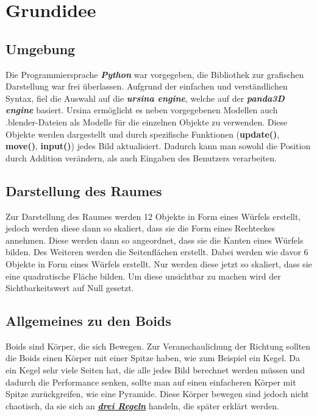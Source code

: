 \documentclass[a4paper, hidelinks, 12pt]{article}
\begin{document}
\section{Grundidee}
\subsection{Umgebung}
Die Programmiersprache \emph{\textbf{Python}} war vorgegeben, die Bibliothek zur grafischen Darstellung war frei überlassen. Aufgrund der einfachen und verständlichen Syntax, fiel die Auswahl auf die \emph{\textbf{ursina engine}}\cite{2022k}, welche auf der \emph{\textbf{panda3D engine}} basiert. Ursina ermöglicht es neben vorgegebenen Modellen auch .blender-Dateien als Modelle für die einzelnen Objekte zu verwenden. Diese Objekte werden dargestellt und durch spezifische Funktionen (\textbf{update()}, \textbf{move()}, \textbf{input()}) jedes Bild aktualisiert\cite{2022}. Dadurch kann man sowohl die Position durch Addition verändern, als auch Eingaben des Benutzers verarbeiten. 
	
\subsection{Darstellung des Raumes}
Zur Darstellung des Raumes werden 12 Objekte in Form eines Würfels erstellt, jedoch werden diese dann so skaliert, dass sie die Form eines Rechteckes annehmen. Diese werden dann so angeordnet, dass sie die Kanten eines Würfels bilden. 
Des Weiteren werden die Seitenflächen erstellt. Dabei werden wie davor 6 Objekte in Form eines Würfels erstellt. Nur werden diese jetzt so skaliert, dass sie eine quadratische Fläche bilden. Um diese unsichtbar zu machen wird der Sichtbarkeitswert auf Null gesetzt.\cite{2022l}
		
\subsection{Allgemeines zu den Boids}
Boids sind Körper, die sich Bewegen. Zur Veranschaulichung der Richtung sollten die Boids einen Körper mit einer Spitze haben, wie zum Beispiel ein Kegel. Da ein Kegel sehr viele Seiten hat, die alle jedes Bild berechnet werden müssen und dadurch die Performance senken, sollte man auf einen einfacheren Körper mit Spitze zurückgreifen, wie eine Pyramide. Diese Körper bewegen sind jedoch nicht chaotisch, da sie sich an \hyperref[sec:Regel]{\textbf{\emph{drei Regeln}}} handeln, die später erklärt werden.\linebreak
\newpage
\end{document}
